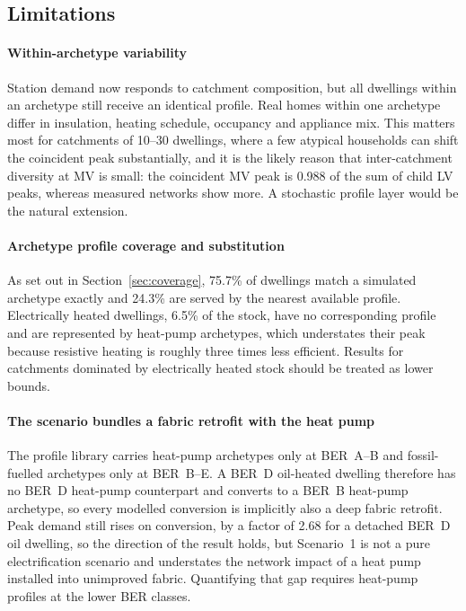 \documentclass[preprint,12pt]{elsarticle}
\begin{document}
\subsection{Limitations}
\label{sec:limitations}

\paragraph{Within-archetype variability}
Station demand now responds to catchment composition, but all dwellings
within an archetype still receive an identical profile. Real homes within one
archetype differ in insulation, heating schedule, occupancy and appliance
mix. This matters most for catchments of 10--30 dwellings, where a few
atypical households can shift the coincident peak substantially, and it is
the likely reason that inter-catchment diversity at MV is small: the
coincident MV peak is 0.988 of the sum of child LV peaks, whereas measured
networks show more. A stochastic profile layer would be the natural
extension.

\paragraph{Archetype profile coverage and substitution}
As set out in Section~\ref{sec:coverage}, 75.7\% of dwellings match a
simulated archetype exactly and 24.3\% are served by the nearest available
profile. Electrically heated dwellings, 6.5\% of the stock, have no
corresponding profile and are represented by heat-pump archetypes, which
understates their peak because resistive heating is roughly three times less
efficient. Results for catchments dominated by electrically heated stock
should be treated as lower bounds.

\paragraph{The scenario bundles a fabric retrofit with the heat pump}
The profile library carries heat-pump archetypes only at BER~A--B and
fossil-fuelled archetypes only at BER~B--E. A BER~D oil-heated dwelling
therefore has no BER~D heat-pump counterpart and converts to a BER~B
heat-pump archetype, so every modelled conversion is implicitly also a deep
fabric retrofit. Peak demand still rises on conversion, by a factor of 2.68
for a detached BER~D oil dwelling, so the direction of the result holds, but
Scenario~1 is not a pure electrification scenario and understates the network
impact of a heat pump installed into unimproved fabric. Quantifying that gap
requires heat-pump profiles at the lower BER classes.
\end{document}
